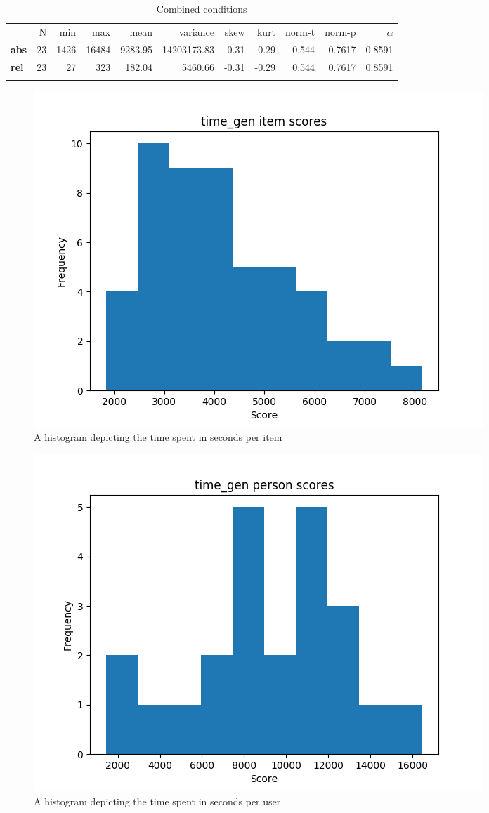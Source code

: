 \begin{longtable}[c]{@{}lrrrrrrrrrr@{}}
\caption{Combined conditions}
\endfirsthead
\toprule\addlinespace
& N & min & max & mean & variance & skew & kurt & norm-t &
norm-p & $\alpha$
\\\addlinespace
\midrule
\textbf{abs} & 23 & 1426 & 16484 & 9283.95 & 14203173.83 & -0.31 & -0.29
& 0.544 & 0.7617 & 0.8591
\\\addlinespace
\textbf{rel} & 23 & 27 & 323 & 182.04 & 5460.66 & -0.31 & -0.29 & 0.544
& 0.7617 & 0.8591
\\\addlinespace
\bottomrule
    \label{tab:time_gen}
\end{longtable}

\begin{figure}
    \includegraphics[width=\textwidth]{img/time_gen_diff.png}
    \caption{A histogram depicting the time spent in seconds per item} 
    \label{fig:time_gen_diff}
\end{figure}
\begin{figure}
    \includegraphics[width=\textwidth]{img/time_gen_abil.png}
    \caption{A histogram depicting the time spent in seconds per user}
    \label{fig:time_gen_abil}
\end{figure}

